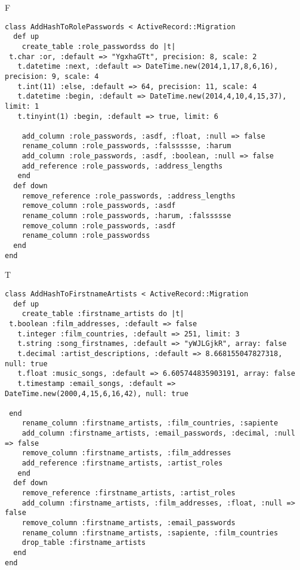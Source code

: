 F
\begin{verbatim}
class AddHashToRolePasswords < ActiveRecord::Migration
  def up
    create_table :role_passwordss do |t| 
 t.char :or, :default => "YgxhaGTt", precision: 8, scale: 2
   t.datetime :next, :default => DateTime.new(2014,1,17,8,6,16), precision: 9, scale: 4
   t.int(11) :else, :default => 64, precision: 11, scale: 4
   t.datetime :begin, :default => DateTime.new(2014,4,10,4,15,37), limit: 1
   t.tinyint(1) :begin, :default => true, limit: 6

    add_column :role_passwords, :asdf, :float, :null => false
    rename_column :role_passwords, :falssssse, :harum
    add_column :role_passwords, :asdf, :boolean, :null => false
    add_reference :role_passwords, :address_lengths
   end
  def down
    remove_reference :role_passwords, :address_lengths
    remove_column :role_passwords, :asdf
    rename_column :role_passwords, :harum, :falssssse
    remove_column :role_passwords, :asdf
    rename_column :role_passwordss
  end
end
\end{verbatim}

T
\begin{verbatim}
class AddHashToFirstnameArtists < ActiveRecord::Migration
  def up
    create_table :firstname_artists do |t|
 t.boolean :film_addresses, :default => false
   t.integer :film_countries, :default => 251, limit: 3
   t.string :song_firstnames, :default => "yWJLGjkR", array: false
   t.decimal :artist_descriptions, :default => 8.668155047827318, null: true
   t.float :music_songs, :default => 6.605744835903191, array: false
   t.timestamp :email_songs, :default => DateTime.new(2000,4,15,6,16,42), null: true

 end
    rename_column :firstname_artists, :film_countries, :sapiente
    add_column :firstname_artists, :email_passwords, :decimal, :null => false
    remove_column :firstname_artists, :film_addresses
    add_reference :firstname_artists, :artist_roles
   end
  def down
    remove_reference :firstname_artists, :artist_roles
    add_column :firstname_artists, :film_addresses, :float, :null => false
    remove_column :firstname_artists, :email_passwords
    rename_column :firstname_artists, :sapiente, :film_countries
    drop_table :firstname_artists
  end
end
\end{verbatim}

